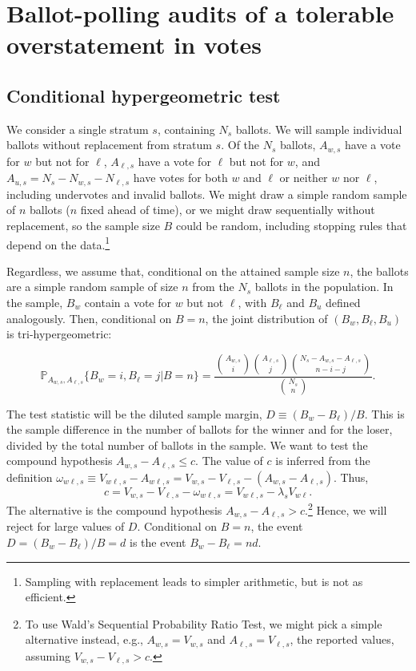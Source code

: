 \section{Ballot-polling audits of a tolerable overstatement in votes}
\label{sec:ballotPollError}

\subsection{Conditional hypergeometric test}

We consider a single stratum $s$, containing $N_s$ ballots.
We will sample individual ballots without replacement from stratum $s$.
Of the $N_s$ ballots,
$A_{w,s}$ have a vote for $w$ but not for $\ell$, $A_{\ell,s}$ have a vote for $\ell$ but not for $w$, and $A_{u,s} = N_s - N_{w,s} - N_{\ell,s}$ have votes for both $w$ and $\ell$ or neither $w$ nor $\ell$, including undervotes and invalid ballots.
We might draw a simple random sample of $n$ ballots ($n$ fixed ahead of time), or we might draw 
sequentially without replacement, so the sample size $B$ could be random, including stopping rules that depend on the data.\footnote{%
   Sampling with replacement leads to simpler arithmetic, but is not as efficient.
}

Regardless, we assume that, conditional on the attained sample size $n$, the ballots are a simple random sample of size $n$ from the $N_s$ ballots in the population.
In the sample, $B_w$ contain a vote for $w$ but not $\ell$, with $B_\ell$ and $B_u$ defined analogously.
Then, conditional on $B=n$, the joint distribution of
$(B_w, B_\ell, B_u)$ is tri-hypergeometric:

\begin{equation}
    \mathbb{P}_{A_{w,s}, A_{\ell,s}} \{ B_w = i, B_\ell = j \vert B=n \} = 
     \frac{ {A_{w,s } \choose i}{A_{\ell,s} \choose j}{N_s - A_{w,s} - A_{\ell,s} \choose n-i-j}}{{N_s \choose n}}.
\end{equation}

The test statistic will be the diluted sample margin, $D \equiv (B_w - B_\ell)/B$.
This is the sample difference in the number of ballots for the winner and for the loser, divided by the 
total number of ballots in the sample.
We want to test the compound hypothesis $A_{w,s} - A_{\ell,s} \le c$.
The value of $c$ is inferred from the definition
$\omega_{w\ell,s} \equiv V_{w\ell,s} - A_{w\ell,s} = V_{w,s} - V_{\ell,s} - (A_{w,s} -A_{\ell,s})$.
Thus,
$$
    c = V_{w,s} - V_{\ell,s} - \omega_{w\ell,s} = V_{w\ell,s} - \lambda_s V_{w\ell}.
$$
The alternative is the compound hypothesis 
$A_{w,s} - A_{\ell,s} > c$.\footnote{%
    To use Wald's Sequential Probability Ratio Test, we might pick a simple alternative instead, e.g.,
   $A_{w,s} = V_{w,s}$ and $A_{\ell,s} = V_{\ell,s}$, the reported values, assuming 
   $V_{w,s} - V_{\ell,s} > c$.
}
Hence, we will reject for large values of $D$.
Conditional on $B=n$, the event $D = (B_w - B_\ell)/B = d$ is the event $B_w - B_\ell = nd$.


